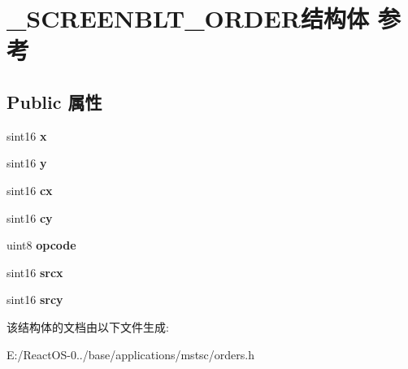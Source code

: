 \hypertarget{struct___s_c_r_e_e_n_b_l_t___o_r_d_e_r}{}\section{\+\_\+\+S\+C\+R\+E\+E\+N\+B\+L\+T\+\_\+\+O\+R\+D\+E\+R结构体 参考}
\label{struct___s_c_r_e_e_n_b_l_t___o_r_d_e_r}
\subsection*{Public 属性}
\begin{DoxyCompactItemize}
\item 
\mbox{\label{struct___s_c_r_e_e_n_b_l_t___o_r_d_e_r_a8e01421df7689b3c70d4a75ae3abacc6}} 
sint16 {\bfseries x}
\item 
\mbox{\label{struct___s_c_r_e_e_n_b_l_t___o_r_d_e_r_af0cf8082b5ae302f70966776a4c0520b}} 
sint16 {\bfseries y}
\item 
\mbox{\label{struct___s_c_r_e_e_n_b_l_t___o_r_d_e_r_a9ed6d651b64722b2a0548b11d997165d}} 
sint16 {\bfseries cx}
\item 
\mbox{\label{struct___s_c_r_e_e_n_b_l_t___o_r_d_e_r_aadba2dad003e54ee08605101df1af066}} 
sint16 {\bfseries cy}
\item 
\mbox{\label{struct___s_c_r_e_e_n_b_l_t___o_r_d_e_r_ab6e9c0a6347a19950944de750ac530c0}} 
uint8 {\bfseries opcode}
\item 
\mbox{\label{struct___s_c_r_e_e_n_b_l_t___o_r_d_e_r_a9fb8d70b5289676f895c6f011a05046b}} 
sint16 {\bfseries srcx}
\item 
\mbox{\label{struct___s_c_r_e_e_n_b_l_t___o_r_d_e_r_acb773d9f482a411186666dd42f717c72}} 
sint16 {\bfseries srcy}
\end{DoxyCompactItemize}


该结构体的文档由以下文件生成\+:\begin{DoxyCompactItemize}
\item 
E\+:/\+React\+O\+S-\/0../base/applications/mstsc/orders.\+h\end{DoxyCompactItemize}

